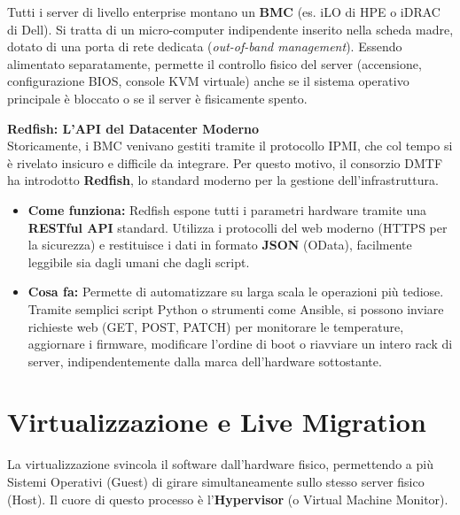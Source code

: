 \begin{tipbox}
Tutti i server di livello enterprise montano un \textbf{BMC} (es. iLO di HPE o iDRAC di Dell). Si tratta di un micro-computer indipendente inserito nella scheda madre, dotato di una porta di rete dedicata (\textit{out-of-band management}). Essendo alimentato separatamente, permette il controllo fisico del server (accensione, configurazione BIOS, console KVM virtuale) anche se il sistema operativo principale è bloccato o se il server è fisicamente spento.

\textbf{Redfish: L'API del Datacenter Moderno}\\
Storicamente, i BMC venivano gestiti tramite il protocollo IPMI, che col tempo si è rivelato insicuro e difficile da integrare. Per questo motivo, il consorzio DMTF ha introdotto \textbf{Redfish}, lo standard moderno per la gestione dell'infrastruttura.
\begin{itemize}
    \item \textbf{Come funziona:} Redfish espone tutti i parametri hardware tramite una \textbf{RESTful API} standard. Utilizza i protocolli del web moderno (HTTPS per la sicurezza) e restituisce i dati in formato \textbf{JSON} (OData), facilmente leggibile sia dagli umani che dagli script.
    \item \textbf{Cosa fa:} Permette di automatizzare su larga scala le operazioni più tediose. Tramite semplici script Python o strumenti come Ansible, si possono inviare richieste web (GET, POST, PATCH) per monitorare le temperature, aggiornare i firmware, modificare l'ordine di boot o riavviare un intero rack di server, indipendentemente dalla marca dell'hardware sottostante.
\end{itemize}
\end{tipbox}

\section{Virtualizzazione e Live Migration}
La virtualizzazione svincola il software dall'hardware fisico, permettendo a più Sistemi Operativi (Guest) di girare simultaneamente sullo stesso server fisico (Host). Il cuore di questo processo è l'\textbf{Hypervisor} (o Virtual Machine Monitor).

